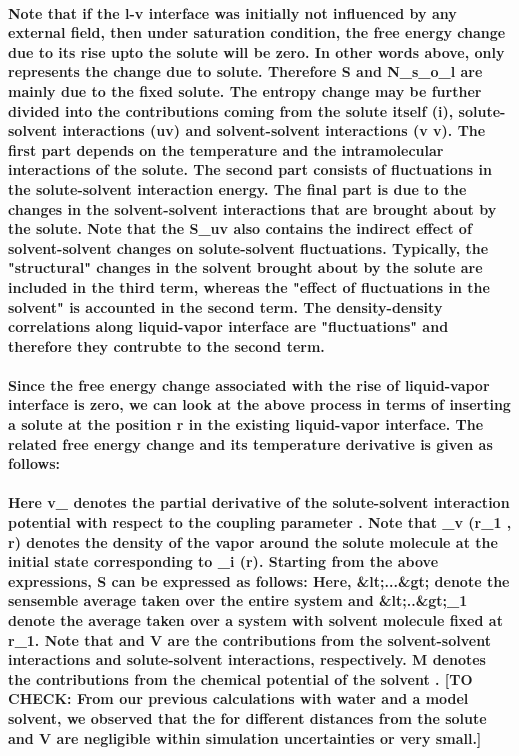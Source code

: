 \documentclass[a4paper,12pt,single,pdftex]{scrartcl}
\begin{document}
{\label{ID_863437212}\paragraph{Note that if the l-v interface was initially not influenced by any external field, then under saturation condition, the free energy change due to its rise upto the solute will be zero. In other words \Delta \mu above, only represents the change due to solute. Therefore \Delta S and \Delta N_s_o_l are mainly due to the fixed solute. The entropy change may be further divided into the contributions coming from the solute itself (i), solute-solvent interactions (uv) and solvent-solvent interactions (v v). The first part depends on the temperature and the intramolecular interactions of the solute. The second part consists of fluctuations in the solute-solvent interaction energy. The final part is due to the changes in the solvent-solvent interactions that are brought about by the solute. Note that the \Delta S_{uv} also contains the indirect effect of solvent-solvent changes on solute-solvent fluctuations. Typically, the "structural" changes in the solvent brought about by the solute are included in the third term, whereas the "effect of fluctuations in the solvent" is accounted in the second term. The density-density correlations along liquid-vapor interface are "fluctuations" and therefore they contrubte to the second term.}

\label{ID_1074911865}\paragraph{Since the free energy change associated with the rise of liquid-vapor interface is zero, we can look at the above process in terms of inserting a solute at the position r in the existing liquid-vapor interface. The related free energy change and its temperature derivative is given as follows:}

\label{ID_388366021}\paragraph{Here v_{\Psi} denotes the partial derivative of the solute-solvent interaction potential with respect to the coupling parameter \lambda. Note that \rho_v (r_1 , r) denotes the density of the vapor around the solute molecule at the initial state corresponding to \Omega_i (r). Starting from the above expressions, \delta S can be expressed as follows: Here, &lt;...&gt; denote the sensemble average taken over the entire system and &lt;..&gt;_1 denote the average taken over a system with solvent molecule fixed at r_1.  Note that \Phi and V are the contributions from the solvent-solvent interactions and solute-solvent interactions, respectively. M denotes the contributions from the chemical potential of the solvent . [TO CHECK: From our previous calculations with water and a model solvent, we observed that the for different distances from the solute \Phi and V are negligible within simulation uncertainties or very small.]}

}
\end{document}
